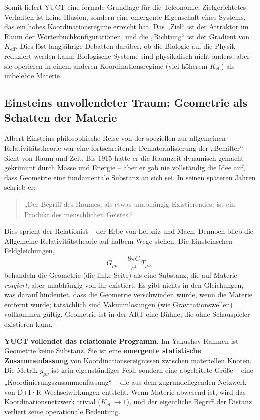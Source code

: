 \documentclass[12pt,a4paper]{article}
\begin{document}
	Somit liefert YUCT eine formale Grundlage für die Teleonomie: Zielgerichtetes Verhalten ist keine Illusion, sondern eine emergente Eigenschaft eines Systems, das ein hohes Koordinationsregime erreicht hat. Das „Ziel“ ist der Attraktor im Raum der Wörterbuchkonfigurationen, und die „Richtung“ ist der Gradient von \(K_{\mathrm{eff}}\). Dies löst langjährige Debatten darüber, ob die Biologie auf die Physik reduziert werden kann: Biologische Systeme sind physikalisch nicht anders, aber sie operieren in einem anderen Koordinationsregime (viel höherem \(K_{\mathrm{eff}}\)) als unbelebte Materie.
	
	\subsection{Einsteins unvollendeter Traum: Geometrie als Schatten der Materie}
	
	Albert Einsteins philosophische Reise von der speziellen zur allgemeinen Relativitätstheorie war eine fortschreitende Dematerialisierung der „Behälter“-Sicht von Raum und Zeit. Bis 1915 hatte er die Raumzeit dynamisch gemacht – gekrümmt durch Masse und Energie – aber er gab nie vollständig die Idee auf, dass Geometrie eine fundamentale Substanz an sich sei. In seinen späteren Jahren schrieb er:
	
	\begin{quote}
		„Der Begriff des Raumes, als etwas unabhängig Existierendes, ist ein Produkt des menschlichen Geistes.“
	\end{quote}
	
	Dies spricht der Relationist – der Erbe von Leibniz und Mach. Dennoch blieb die Allgemeine Relativitätstheorie auf halbem Wege stehen. Die Einsteinschen Feldgleichungen,
	\[
	G_{\mu\nu} = \frac{8\pi G}{c^4} T_{\mu\nu},
	\]
	behandeln die Geometrie (die linke Seite) als eine Substanz, die auf Materie \emph{reagiert}, aber unabhängig von ihr existiert. Es gibt nichts in den Gleichungen, was darauf hindeutet, dass die Geometrie verschwinden würde, wenn die Materie entfernt würde; tatsächlich sind Vakuumlösungen (wie Gravitationswellen) vollkommen gültig. Geometrie ist in der ART eine Bühne, die ohne Schauspieler existieren kann.
	
	\textbf{YUCT vollendet das relationale Programm.} Im Yakushev-Rahmen ist Geometrie keine Substanz. Sie ist eine \textbf{emergente statistische Zusammenfassung} von Koordinationsereignissen zwischen materiellen Knoten. Die Metrik \(g_{\mu\nu}\) ist kein eigenständiges Feld, sondern eine abgeleitete Größe – eine „Koordinierungszusammenfassung“ – die aus dem zugrundeliegenden Netzwerk von D+I·R-Wechselwirkungen entsteht. Wenn Materie abwesend ist, wird das Koordinationsnetzwerk trivial (\(K_{\mathrm{eff}} \to 1\)), und der eigentliche Begriff der Distanz verliert seine operationale Bedeutung.
	
\end{document}
